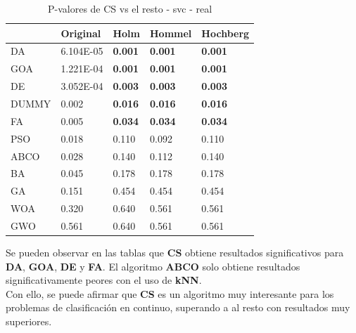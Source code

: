 \begin{table}
    \centering
    \begin{tabular}{lllll}
        \toprule
        {}    & Original  & Holm           & Hommel         & Hochberg       \\
        \midrule
        DA    & 6.104E-05 & \textbf{0.001} & \textbf{0.001} & \textbf{0.001} \\
        GOA   & 1.221E-04 & \textbf{0.001} & \textbf{0.001} & \textbf{0.001} \\
        DE    & 3.052E-04 & \textbf{0.003} & \textbf{0.003} & \textbf{0.003} \\
        DUMMY & 0.002     & \textbf{0.016} & \textbf{0.016} & \textbf{0.016} \\
        FA    & 0.005     & \textbf{0.034} & \textbf{0.034} & \textbf{0.034} \\
        PSO   & 0.018     & 0.110          & 0.092          & 0.110          \\
        ABCO  & 0.028     & 0.140          & 0.112          & 0.140          \\
        BA    & 0.045     & 0.178          & 0.178          & 0.178          \\
        GA    & 0.151     & 0.454          & 0.454          & 0.454          \\
        WOA   & 0.320     & 0.640          & 0.561          & 0.561          \\
        GWO   & 0.561     & 0.640          & 0.561          & 0.561          \\
        \bottomrule
    \end{tabular}
    \caption{P-valores de CS vs el resto - svc - real}
    \label{tab:p-values_cs_rest_real_svc}
\end{table}

Se pueden observar en las tablas que \textbf{CS} obtiene resultados significativos para \textbf{DA}, \textbf{GOA}, \textbf{DE} y \textbf{FA}. El algoritmo \textbf{ABCO} solo obtiene resultados significativamente peores con el uso de \textbf{kNN}.\\[6pt]
Con ello, se puede afirmar que \textbf{CS} es un algoritmo muy interesante para los problemas de clasificación en continuo, superando a al resto con resultados muy superiores.

